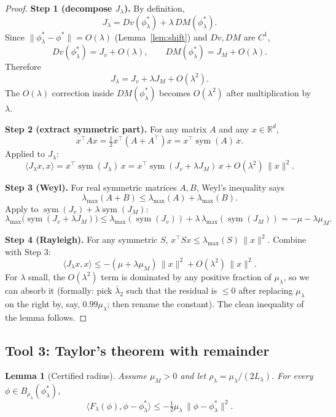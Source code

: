\documentclass[11pt]{article}
\newtheorem{lemma}{Lemma}
\newcommand{\R}{\mathbb{R}}
\newcommand{\sym}{\operatorname{sym}}
\begin{document}
\begin{proof}
\textbf{Step 1 (decompose $J_\lambda$).}
By definition,
\[
J_\lambda = Dv(\phi^*_\lambda) + \lambda\, DM(\phi^*_\lambda).
\]
Since $\|\phi^*_\lambda - \phi^*\| = O(\lambda)$ (Lemma~\ref{lem:shift}) and $Dv, DM$ are $C^1$,
\[
Dv(\phi^*_\lambda) = J_v + O(\lambda), \qquad DM(\phi^*_\lambda) = J_M + O(\lambda).
\]
Therefore
\[
J_\lambda = J_v + \lambda J_M + O(\lambda^2).
\]
The $O(\lambda)$ correction inside $DM(\phi^*_\lambda)$ becomes $O(\lambda^2)$ after multiplication by $\lambda$.

\textbf{Step 2 (extract symmetric part).}
For any matrix $A$ and any $x \in \R^d$,
\[
x^\top A x = \tfrac{1}{2} x^\top (A + A^\top) x = x^\top \sym(A)\, x.
\]
Applied to $J_\lambda$:
\[
\langle J_\lambda x, x\rangle = x^\top \sym(J_\lambda)\, x = x^\top \sym(J_v + \lambda J_M)\, x + O(\lambda^2)\, \|x\|^2.
\]

\textbf{Step 3 (Weyl).}
For real symmetric matrices $A, B$, Weyl's inequality says
\[
\lambda_{\max}(A + B) \le \lambda_{\max}(A) + \lambda_{\max}(B).
\]
Apply to $\sym(J_v) + \lambda \sym(J_M)$:
\[
\lambda_{\max}\!\bigl(\sym(J_v + \lambda J_M)\bigr) \le \lambda_{\max}(\sym(J_v)) + \lambda\, \lambda_{\max}(\sym(J_M)) = -\mu - \lambda \mu_M.
\]

\textbf{Step 4 (Rayleigh).}
For any symmetric $S$, $x^\top S x \le \lambda_{\max}(S)\, \|x\|^2$. Combine with Step 3:
\[
\langle J_\lambda x, x\rangle \le -(\mu + \lambda \mu_M)\, \|x\|^2 + O(\lambda^2)\, \|x\|^2.
\]
For $\lambda$ small, the $O(\lambda^2)$ term is dominated by any positive fraction of $\mu_\lambda$, so we can absorb it (formally: pick $\bar\lambda_2$ such that the residual is $\le 0$ after replacing $\mu_\lambda$ on the right by, say, $0.99 \mu_\lambda$; then rename the constant). The clean inequality of the lemma follows.
\end{proof}

\subsection{Tool 3: Taylor's theorem with remainder}

\begin{lemma}[Certified radius]\label{lem:taylor}
Assume $\mu_M > 0$ and let $\rho_\lambda = \mu_\lambda / (2 L_\lambda)$. For every $\phi \in B_{\rho_\lambda}(\phi^*_\lambda)$,
\[
\langle F_\lambda(\phi), \phi - \phi^*_\lambda\rangle \le -\tfrac{1}{2} \mu_\lambda\, \|\phi - \phi^*_\lambda\|^2.
\]
\end{lemma}
\end{document}
